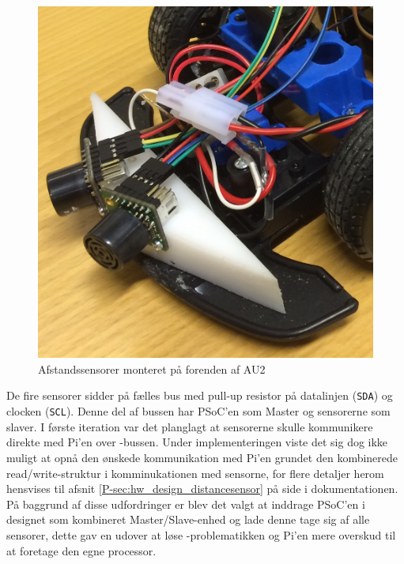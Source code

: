 \begin{figure}[ht]
	\centering
	\includegraphics[scale=0.1]{../fig/billeder/distancesensor_montering.jpg}
	\caption{Afstandssensorer monteret på forenden af AU2}
	\label{fig:ds_mont}
\end{figure}

De fire sensorer sidder på fælles \IIC bus med pull-up resistor på datalinjen (\texttt{SDA}) og clocken (\texttt{SCL}). 
Denne del af bussen har PSoC'en som Master og sensorerne som slaver.
I første iteration var det planglagt at sensorerne skulle kommunikere direkte med Pi'en over \IIC-bussen. 
Under implementeringen viste det sig dog ikke muligt at opnå den ønskede kommunikation med Pi'en grundet den kombinerede read/write-struktur i komminukationen med sensorne, for flere detaljer herom hensvises til afsnit \ref{P-sec:hw_design_distancesensor}  på side \pageref{P-sec:hw_design_distancesensor} i dokumentationen. 
På baggrund af disse udfordringer er blev det valgt at inddrage PSoC'en i designet som kombineret Master/Slave-enhed og lade denne tage sig af alle sensorer, dette gav en udover at løse \IIC-problematikken og Pi'en mere overskud til at foretage den egne processor.